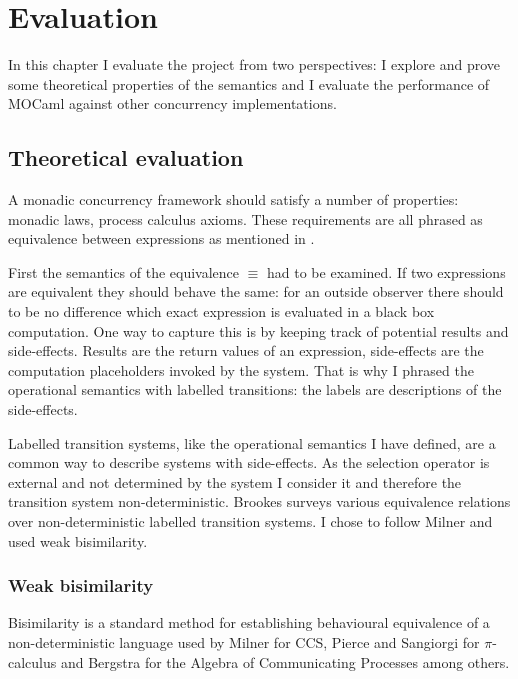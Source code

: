\documentclass[12pt,twoside,notitlepage]{report}
\theoremstyle{plain}%
\theoremstyle{definition}
\theoremstyle{remark}
\begin{document}
\cleardoublepage
\chapter{Evaluation}
In this chapter I evaluate the project from two perspectives: I explore and prove some theoretical properties of the semantics and I evaluate the performance of MOCaml against other concurrency implementations.


\section{Theoretical evaluation}
\label{sec:behave_equiv}
A monadic concurrency framework should satisfy a number of properties: monadic laws, process calculus axioms. These requirements are all phrased as equivalence between expressions as mentioned in . 

First the semantics of the equivalence $ \equiv $ had to be examined. If two expressions are equivalent they should behave the same: for an outside observer there should to be no difference which exact expression is evaluated in a black box computation. One way to capture this is by keeping track of potential results and side-effects. Results are the return values of an expression, side-effects are the computation placeholders invoked by the system. That is why I phrased the operational semantics with labelled transitions: the labels are descriptions of the side-effects.

Labelled transition systems, like the operational semantics I have defined, are a common way to describe systems with side-effects. As the selection operator is external and not determined by the system I consider it and therefore the transition system non-deterministic. Brookes\cite{brookes1983behavioural} surveys various equivalence relations over non-deterministic labelled transition systems. I chose to follow Milner\cite{milner1982calculus} and used weak bisimilarity.

\subsection{Weak bisimilarity}
Bisimilarity is a standard method for establishing behavioural equivalence of a non-deterministic language used by Milner for CCS\cite{milner1982calculus}, Pierce and Sangiorgi for $ \pi $-calculus\cite{pierce2000behavioral} and Bergstra for the Algebra of Communicating Processes\cite{bergstra1985algebra,bergstra1986algebra} among others. 
\end{document}
